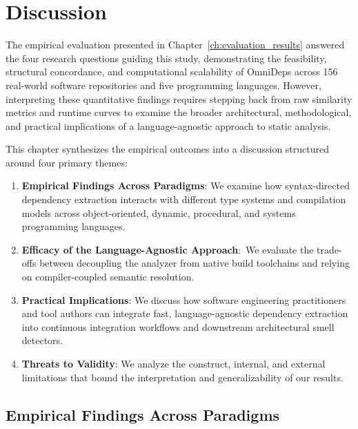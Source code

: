 \chapter{Discussion}
\label{ch:discussion}

The empirical evaluation presented in Chapter~\ref{ch:evaluation_results}
answered the four research questions guiding this study, demonstrating the
feasibility, structural concordance, and computational scalability of OmniDeps
across 156 real-world software repositories and five programming languages.
However, interpreting these quantitative findings requires stepping
back from raw
similarity metrics and runtime curves to examine the broader architectural,
methodological, and practical implications of a language-agnostic
approach to static
analysis.

This chapter synthesizes the empirical outcomes into a discussion
structured around four primary themes:
\begin{enumerate}
  \item \textbf{Empirical Findings Across Paradigms}: We examine how
    syntax-directed dependency extraction interacts with different type systems
    and compilation models across object-oriented, dynamic, procedural, and
    systems programming languages.
  \item \textbf{Efficacy of the Language-Agnostic Approach}:\ We evaluate
    the\linebreak
    trade-offs between decoupling the analyzer from native build toolchains and
    relying on compiler-coupled semantic resolution.
  \item \textbf{Practical Implications}: We discuss how software engineering
    practitioners and tool authors can integrate fast, language-agnostic
    dependency extraction into continuous integration workflows and downstream
    architectural smell detectors.
  \item \textbf{Threats to Validity}: We analyze the construct, internal, and
    external limitations that bound the interpretation and generalizability of
    our results.
\end{enumerate}

\section{Empirical Findings Across Paradigms}
\label{sec:discussion_findings}

